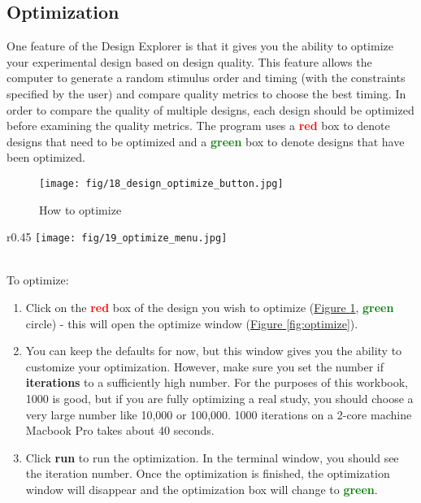 \documentclass[10pt]{article}
\begin{document}
	\subsection{Optimization}
	\label{subsec:u5optimization}
		One feature of the Design Explorer is that it gives you the ability to optimize your experimental design based on design quality.
		This feature allows the computer to generate a random stimulus order and timing (with the constraints specified by the user) and compare quality metrics to choose the best timing.
		In order to compare the quality of multiple designs, each design should be optimized before examining the quality metrics.
		The program uses a \textcolor{red}{\textbf{red}} box to denote designs that need to be optimized and a \textcolor{green}{\textbf{green}} box to denote designs that have been optimized. \\
		\begin{figure}[ht]
			\centering
			\texttt{[image: fig/18\_design\_optimize\_button.jpg]}
			\caption{How to optimize}
			\label{fig:select_optimize}
		\end{figure}
		\begin{wrapfigure}{r}{0.45\textwidth}
			\centering
			\texttt{[image: fig/19\_optimize\_menu.jpg]}
			\caption{Optimization window}
			\label{fig:optimize}
		\end{wrapfigure} \\
		To optimize:
		\begin{enumerate}
			\item Click on the \textcolor{red}{\textbf{red}} box of the design you wish to optimize (\hyperref[fig:select_optimize]{Figure \ref{fig:select_optimize}}, \textcolor{green}{\textbf{green}} circle) - this will open the optimize window (\hyperref[fig:optimize]{Figure \ref{fig:optimize}}).
			\item You can keep the defaults for now, but this window gives you the ability to customize your optimization.
			However, make sure you set the number if \textbf{iterations} to a sufficiently high number.
			For the purposes of this workbook, 1000 is good, but if you are fully optimizing a real study, you should choose a very large number like 10,000 or 100,000.
			1000 iterations on a 2-core machine Macbook Pro takes about 40 seconds.
			\item Click \textbf{run} to run the optimization.
			In the terminal window, you should see the iteration number.
			Once the optimization is finished, the optimization window will disappear and the optimization box will change to \textcolor{green}{\textbf{green}}.
		\end{enumerate}
\end{document}
